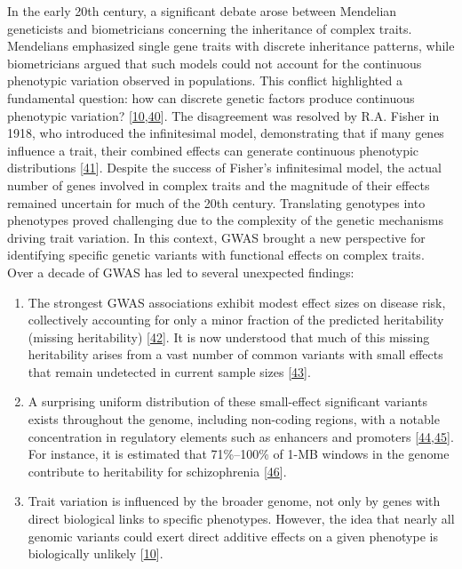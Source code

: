 In the early 20th century, a significant debate arose between Mendelian geneticists and biometricians concerning the inheritance of complex traits.
Mendelians emphasized single gene traits with discrete inheritance patterns, while biometricians argued that such models could not account for the continuous phenotypic variation observed in populations.
This conflict highlighted a fundamental question: how can discrete genetic factors produce continuous phenotypic variation? {[}\protect\hyperlink{ref-vpIDZCSa}{10},\protect\hyperlink{ref-15ldVppuv}{40}{]}.
The disagreement was resolved by R.A. Fisher in 1918, who introduced the infinitesimal model, demonstrating that if many genes influence a trait, their combined effects can generate continuous phenotypic distributions {[}\protect\hyperlink{ref-Qxk70FFV}{41}{]}.
Despite the success of Fisher's infinitesimal model, the actual number of genes involved in complex traits and the magnitude of their effects remained uncertain for much of the 20th century.
Translating genotypes into phenotypes proved challenging due to the complexity of the genetic mechanisms driving trait variation.
In this context, GWAS brought a new perspective for identifying specific genetic variants with functional effects on complex traits.
Over a decade of GWAS has led to several unexpected findings:

\begin{enumerate}
\def\labelenumi{\arabic{enumi}.}
\item
  The strongest GWAS associations exhibit modest effect sizes on disease risk, collectively accounting for only a minor fraction of the predicted heritability (missing heritability) {[}\protect\hyperlink{ref-RASeYPIy}{42}{]}.
  It is now understood that much of this missing heritability arises from a vast number of common variants with small effects that remain undetected in current sample sizes {[}\protect\hyperlink{ref-1AOy1zxAv}{43}{]}.
\item
  A surprising uniform distribution of these small-effect significant variants exists throughout the genome, including non-coding regions, with a notable concentration in regulatory elements such as enhancers and promoters {[}\protect\hyperlink{ref-mwTa2RUK}{44},\protect\hyperlink{ref-lVJVFaaZ}{45}{]}.
  For instance, it is estimated that 71\%--100\% of 1-MB windows in the genome contribute to heritability for schizophrenia {[}\protect\hyperlink{ref-XvQe1H3A}{46}{]}.
\item
  Trait variation is influenced by the broader genome, not only by genes with direct biological links to specific phenotypes.
  However, the idea that nearly all genomic variants could exert direct additive effects on a given phenotype is biologically unlikely {[}\protect\hyperlink{ref-vpIDZCSa}{10}{]}.
\end{enumerate}

